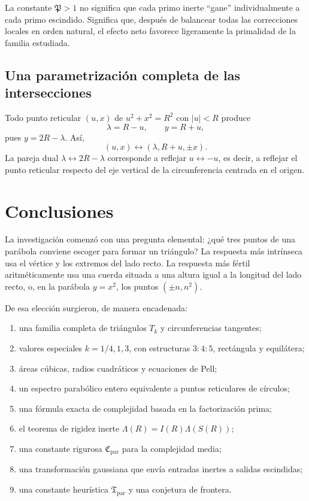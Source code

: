 \documentclass[11pt,a4paper,openany]{report}
\newcommand{\Lam}{\Lambda}
\begin{document}
\begin{insightbox}
La constante \(\mathfrak P>1\) no significa que cada primo inerte ``gane'' individualmente a cada primo escindido. Significa que, después de balancear todas las correcciones locales en orden natural, el efecto neto favorece ligeramente la primalidad de la familia estudiada.
\end{insightbox}

\section{Una parametrización completa de las intersecciones}

Todo punto reticular \((u,x)\) de \(u^2+x^2=R^2\) con \(|u|<R\) produce
\[
 \lambda=R-u,
 \qquad
 y=R+u,
\]
pues \(y=2R-\lambda\). Así,
\begin{equation}
 (u,x)
 \longleftrightarrow
 \left(\lambda,R+u,\pm x\right).
 \label{eq:full-correspondence}
\end{equation}
La pareja dual \(\lambda\leftrightarrow2R-\lambda\) corresponde a reflejar \(u\leftrightarrow-u\), es decir, a reflejar el punto reticular respecto del eje vertical de la circunferencia centrada en el origen.

\chapter{Conclusiones}

La investigación comenzó con una pregunta elemental: ¿qué tres puntos de una parábola conviene escoger para formar un triángulo? La respuesta más intrínseca usa el vértice y los extremos del lado recto. La respuesta más fértil aritméticamente usa una cuerda situada a una altura igual a la longitud del lado recto, o, en la parábola \(y=x^2\), los puntos \((\pm n,n^2)\).

De esa elección surgieron, de manera encadenada:
\begin{enumerate}
\item una familia completa de triángulos \(T_k\) y circunferencias tangentes;
\item valores especiales \(k=1/4,1,3\), con estructuras \(3:4:5\), rectángula y equilátera;
\item áreas cúbicas, radios cuadráticos y ecuaciones de Pell;
\item un espectro parabólico entero equivalente a puntos reticulares de círculos;
\item una fórmula exacta de complejidad basada en la factorización prima;
\item el teorema de rigidez inerte \(\Lam(R)=I(R)\Lam(S(R))\);
\item una constante rigurosa \(\mathfrak C_{\mathrm{par}}\) para la complejidad media;
\item una transformación gaussiana que envía entradas inertes a salidas escindidas;
\item una constante heurística \(\mathfrak T_{\mathrm{par}}\) y una conjetura de frontera.
\end{enumerate}
\end{document}
